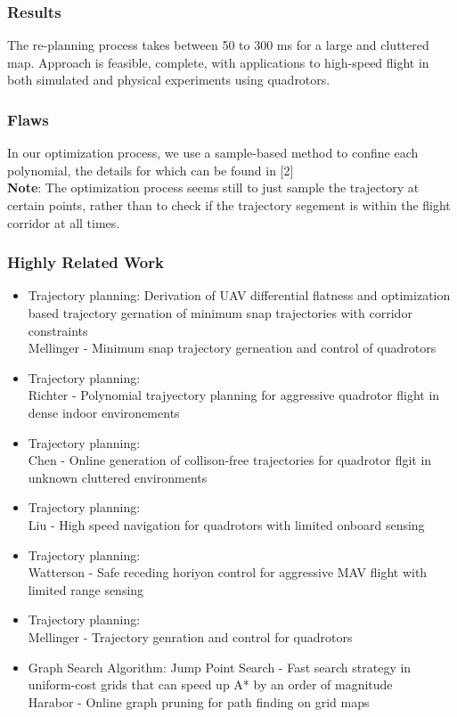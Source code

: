\subsubsection{Results}
The re-planning process takes between 50 to 300 ms for a large and cluttered map. Approach is feasible, complete, with applications to high-speed flight in both simulated and physical experiments using quadrotors.

\subsubsection{Flaws}
In our optimization process, we use a sample-based method
to confine each polynomial, the details for which can be found in [2]
\\

\textbf{Note}: The optimization process seems still to just sample the trajectory at certain points, rather than to check if the trajectory segement is within the flight corridor at all times.

\subsubsection{Highly Related Work}
\begin{itemize}
\item Trajectory planning: Derivation of UAV differential flatness and optimization based trajectory gernation of minimum snap trajectories with corridor constraints
\\
Mellinger - Minimum snap trajectory gerneation and control of quadrotors

\item Trajectory planning: 
\\
Richter - Polynomial trajyectory planning for aggressive quadrotor flight in dense indoor environements

\item Trajectory planning:
\\
Chen - Online generation of collison-free trajectories for quadrotor flgit in unknown cluttered environments

\item Trajectory planning:
\\
Liu - High speed navigation for quadrotors with limited onboard sensing

\item Trajectory planning:
\\
Watterson - Safe receding horiyon control for aggressive MAV flight with limited range sensing

\item Trajectory planning:
\\
Mellinger - Trajectory genration and control for quadrotors

\item Graph Search Algorithm: Jump Point Search - Fast search strategy in uniform-cost grids that can speed up A* by an order of magnitude
\\
Harabor - Online graph pruning for path finding on grid maps

\end{itemize}

